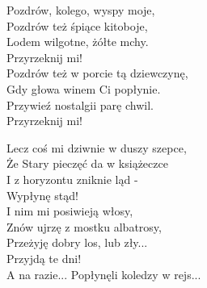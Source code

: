 \begin{multicols}{2}
Pozdrów, kolego, wyspy moje, \\
Pozdrów też śpiące kitoboje, \\
Lodem wilgotne, żółte mchy. \\
Przyrzeknij mi! \\

Pozdrów też w porcie tą dziewczynę, \\
Gdy głowa winem Ci popłynie. \\
Przywieź nostalgii parę chwil. \\
Przyrzeknij mi! \\
\newcolumn

Lecz coś mi dziwnie w duszy szepce, \\
Że Stary pieczęć da w książeczce \\
I z horyzontu zniknie ląd - \\
Wypłynę stąd! \\

I nim mi posiwieją włosy, \\
Znów ujrzę z mostku albatrosy, \\
Przeżyję dobry los, lub zły... \\
Przyjdą te dni! \\

A na razie...
Popłynęli koledzy w rejs...
\end{multicols}
